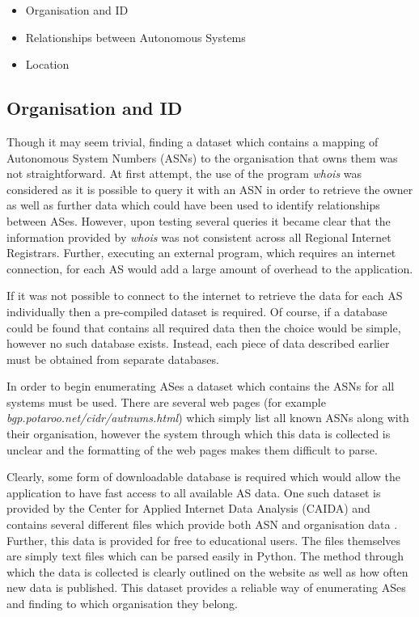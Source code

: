 \begin{itemize}
	\item{Organisation and ID}
	\item{Relationships between Autonomous Systems}
	\item{Location}
\end{itemize}

\subsection{Organisation and ID}
Though it may seem trivial, finding a dataset which contains a mapping of Autonomous System Numbers (ASNs) to the organisation that owns them was not straightforward. At first attempt, the use of the program \textit{whois} was considered as it is possible to query it with an ASN in order to retrieve the owner as well as further data which could have been used to identify relationships between ASes. However, upon testing several queries it became clear that the information provided by \textit{whois} was not consistent across all Regional Internet Registrars. Further, executing an external program, which requires an internet connection, for each AS would add a large amount of overhead to the application. 

If it was not possible to connect to the internet to retrieve the data for each AS individually then a pre-compiled dataset is required. Of course, if a database could be found that contains all required data then the choice would be simple, however no such database exists. Instead, each piece of data described earlier must be obtained from separate databases. 

In order to begin enumerating ASes a dataset which contains the ASNs for all systems must be used. There are several web pages (for example \textit{bgp.potaroo.net/cidr/autnums.html}) which simply list all known ASNs along with their organisation, however the system through which this data is collected is unclear and the formatting of the web pages makes them difficult to parse. 

Clearly, some form of downloadable database is required which would allow the application to have fast access to all available AS data. One such dataset is provided by the Center for Applied Internet Data Analysis (CAIDA) and contains several different files which provide both ASN and organisation data \cite{org_mapping_caida_2015}. Further, this data is provided for free to educational users. The files themselves are simply text files which can be parsed easily in Python. The method through which the data is collected is clearly outlined on the website as well as how often new data is published. This dataset provides a reliable way of enumerating ASes and finding to which organisation they belong.

